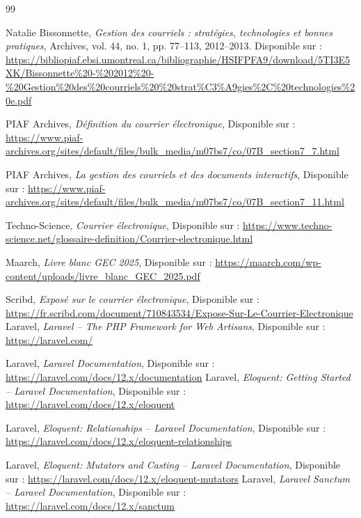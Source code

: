 

\begin{thebibliography}{99}

Natalie Bissonnette,
\textit{Gestion des courriels : stratégies, technologies et bonnes pratiques},
Archives, vol. 44, no. 1, pp. 77--113, 2012--2013.
Disponible sur :
\url{https://bibliopiaf.ebsi.umontreal.ca/bibliographie/HSIFPFA9/download/5TI3E5XK/Bissonnette%20-%202012%20-%20Gestion%20des%20courriels%20%20strat%C3%A9gies%2C%20technologies%20e.pdf}

PIAF Archives,
\textit{Définition du courrier électronique},
Disponible sur :
\url{https://www.piaf-archives.org/sites/default/files/bulk_media/m07bs7/co/07B_section7_7.html}

PIAF Archives,
\textit{La gestion des courriels et des documents interactifs},
Disponible sur :
\url{https://www.piaf-archives.org/sites/default/files/bulk_media/m07bs7/co/07B_section7_11.html}

Techno-Science,
\textit{Courrier électronique},
Disponible sur :
\url{https://www.techno-science.net/glossaire-definition/Courrier-electronique.html}

Maarch,
\textit{Livre blanc GEC 2025},
Disponible sur :
\url{https://maarch.com/wp-content/uploads/livre_blanc_GEC_2025.pdf}

Scribd,
\textit{Exposé sur le courrier électronique},
Disponible sur :
\url{https://fr.scribd.com/document/710843534/Expose-Sur-Le-Courrier-Electronique}
Laravel,
\textit{Laravel -- The PHP Framework for Web Artisans},
Disponible sur :
\url{https://laravel.com/}

Laravel,
\textit{Laravel Documentation},
Disponible sur :
\url{https://laravel.com/docs/12.x/documentation}
Laravel,
\textit{Eloquent: Getting Started -- Laravel Documentation},
Disponible sur :
\url{https://laravel.com/docs/12.x/eloquent}

Laravel,
\textit{Eloquent: Relationships -- Laravel Documentation},
Disponible sur :
\url{https://laravel.com/docs/12.x/eloquent-relationships}

Laravel,
\textit{Eloquent: Mutators and Casting -- Laravel Documentation},
Disponible sur :
\url{https://laravel.com/docs/12.x/eloquent-mutators}
Laravel,
\textit{Laravel Sanctum -- Laravel Documentation},
Disponible sur :
\url{https://laravel.com/docs/12.x/sanctum}


\end{thebibliography}
